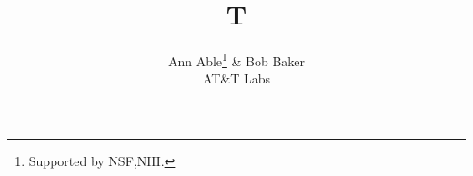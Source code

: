 \documentclass{article}
\newcommand{\amp}{\&}
\newcommand{\comma}{,}
\begin{document}
\title{T}
\author{Ann Able\thanks{Supported by NSF\comma NIH.} \amp{} Bob Baker\\ AT\amp T Labs}
\maketitle
\end{document}
